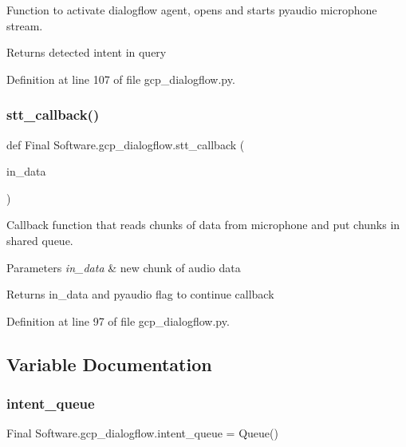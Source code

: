 Function to activate dialogflow agent, opens and starts pyaudio microphone stream. 

\begin{DoxyReturn}{Returns}
detected intent in query 
\end{DoxyReturn}


Definition at line 107 of file gcp\+\_\+dialogflow.\+py.

\mbox{\label{namespace_final_01_software_1_1gcp__dialogflow_ac2ec9b3646a31448b85165f453dd4507}} 
\subsubsection{stt\_callback()}
{\footnotesize\ttfamily def Final Software.\+gcp\+\_\+dialogflow.\+stt\+\_\+callback (\begin{DoxyParamCaption}\item[{}]{in\+\_\+data }\end{DoxyParamCaption})}



Callback function that reads chunks of data from microphone and put chunks in shared queue. 


\begin{DoxyParams}{Parameters}
{\em in\+\_\+data} & new chunk of audio data \\
\hline
\end{DoxyParams}
\begin{DoxyReturn}{Returns}
in\+\_\+data and pyaudio flag to continue callback 
\end{DoxyReturn}


Definition at line 97 of file gcp\+\_\+dialogflow.\+py.



\subsection{Variable Documentation}
\mbox{\label{namespace_final_01_software_1_1gcp__dialogflow_a8b7d0fe1f8f0d9b1d8d81ec21f74015a}} 
\subsubsection{intent\_queue}
{\footnotesize\ttfamily Final Software.\+gcp\+\_\+dialogflow.\+intent\+\_\+queue = Queue()}




